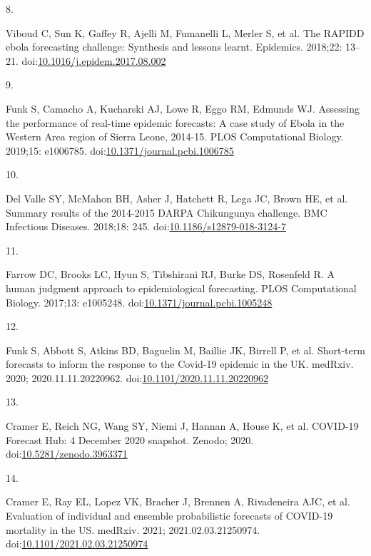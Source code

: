 \documentclass[10pt,letterpaper]{article}
\newlength{\cslhangindent}
\newlength{\csllabelwidth}
\newlength{\cslentryspacingunit} %
\newenvironment{CSLReferences}[2] %
 {%
  \setlength{\parindent}{0pt}
  \ifodd #1
  \let\oldpar\par
  \def\par{\hangindent=\cslhangindent\oldpar}
  \fi
  \setlength{\parskip}{#2\cslentryspacingunit}
 }%
 {}
\newcommand{\CSLLeftMargin}[1]{\parbox[t]{\csllabelwidth}{#1}}
\newcommand{\CSLRightInline}[1]{\parbox[t]{\linewidth - \csllabelwidth}{#1}\break}
\begin{document}
\begin{CSLReferences}{0}{0}
\leavevmode{}%
\CSLLeftMargin{8. }%
\CSLRightInline{Viboud C, Sun K, Gaffey R, Ajelli M, Fumanelli L, Merler
S, et al. The {RAPIDD} ebola forecasting challenge: {Synthesis} and
lessons learnt. Epidemics. 2018;22: 13--21.
doi:\href{https://doi.org/10.1016/j.epidem.2017.08.002}{10.1016/j.epidem.2017.08.002}}

\leavevmode{}%
\CSLLeftMargin{9. }%
\CSLRightInline{Funk S, Camacho A, Kucharski AJ, Lowe R, Eggo RM,
Edmunds WJ. Assessing the performance of real-time epidemic forecasts:
{A} case study of {Ebola} in the {Western Area} region of {Sierra
Leone}, 2014-15. PLOS Computational Biology. 2019;15: e1006785.
doi:\href{https://doi.org/10.1371/journal.pcbi.1006785}{10.1371/journal.pcbi.1006785}}

\leavevmode{}%
\CSLLeftMargin{10. }%
\CSLRightInline{Del Valle SY, McMahon BH, Asher J, Hatchett R, Lega JC,
Brown HE, et al. Summary results of the 2014-2015 {DARPA Chikungunya}
challenge. BMC Infectious Diseases. 2018;18: 245.
doi:\href{https://doi.org/10.1186/s12879-018-3124-7}{10.1186/s12879-018-3124-7}}

\leavevmode{}%
\CSLLeftMargin{11. }%
\CSLRightInline{Farrow DC, Brooks LC, Hyun S, Tibshirani RJ, Burke DS,
Rosenfeld R. A human judgment approach to epidemiological forecasting.
PLOS Computational Biology. 2017;13: e1005248.
doi:\href{https://doi.org/10.1371/journal.pcbi.1005248}{10.1371/journal.pcbi.1005248}}

\leavevmode{}%
\CSLLeftMargin{12. }%
\CSLRightInline{Funk S, Abbott S, Atkins BD, Baguelin M, Baillie JK,
Birrell P, et al. Short-term forecasts to inform the response to the
{Covid-19} epidemic in the {UK}. medRxiv. 2020; 2020.11.11.20220962.
doi:\href{https://doi.org/10.1101/2020.11.11.20220962}{10.1101/2020.11.11.20220962}}

\leavevmode{}%
\CSLLeftMargin{13. }%
\CSLRightInline{Cramer E, Reich NG, Wang SY, Niemi J, Hannan A, House K,
et al. {COVID-19 Forecast Hub}: 4 {December} 2020 snapshot. {Zenodo};
2020.
doi:\href{https://doi.org/10.5281/zenodo.3963371}{10.5281/zenodo.3963371}}

\leavevmode{}%
\CSLLeftMargin{14. }%
\CSLRightInline{Cramer E, Ray EL, Lopez VK, Bracher J, Brennen A,
Rivadeneira AJC, et al. Evaluation of individual and ensemble
probabilistic forecasts of {COVID-19} mortality in the {US}. medRxiv.
2021; 2021.02.03.21250974.
doi:\href{https://doi.org/10.1101/2021.02.03.21250974}{10.1101/2021.02.03.21250974}}


\end{CSLReferences}
\end{document}

